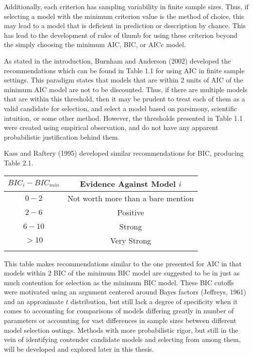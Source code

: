 		Additionally, each criterion has sampling variability in finite sample sizes. Thus, if selecting a model with the minimum criterion value is the method of choice, this may lead to a model that is
		deficient in prediction or description by chance. This has lead to the development of rules of thumb for using these criterion beyond the simply choosing the minimum AIC, BIC, or AICc model.

		As stated in the introduction, Burnham and Anderson (2002) developed the recommendations which can be found in Table 1.1 for using AIC in finite sample settings. This paradigm states that models
		that are within 2 units of AIC of the minimum AIC model are not to be discounted. Thus, if there are multiple models that are within this threshold, then it may be prudent to treat each of them
		as a valid candidate for selection, and select a model based on parsimony, scientific intuition, or some other method. However, the thresholds presented in Table 1.1 were created using empirical
		observation, and do not have any apparent probabilistic justification behind them.

		Kass and Raftery (1995) developed similar recommendations for BIC, producing Table 2.1.
		\begin{table}[H]
		\centering
		{
		\begin{tabular}{ c|c}
		$BIC_{i}-BIC_{min}$ & Evidence Against Model $i$\\
		 \hline
		 $0 - 2$ & Not worth more than a bare mention\\
		 $2 - 6$ & Positive\\
		 $6 - 10$ & Strong\\
		 $> 10$ & Very Strong\\
		 \Xhline{3\arrayrulewidth}
		\end{tabular}
		}
		\end{table}
		This table makes recommendations similar to the one presented for AIC in that models within 2 BIC of the minimum BIC model are suggested to be in just as much contention for selection as
		the minimum BIC model. These BIC cutoffs were motivated using an argument centered around Bayes factors (Jeffreys, 1961) and an approximate $t$ distribution, but still lack a degree of specificity
		when it comes to accounting for comparisons of models differing greatly in number of parameters or accounting for vast differences in sample sizes between different model selection outings.
		Methods with more probabilistic rigor, but still in the vein of identifying contender candidate models and selecting from among them, will be developed and explored later in this thesis.

